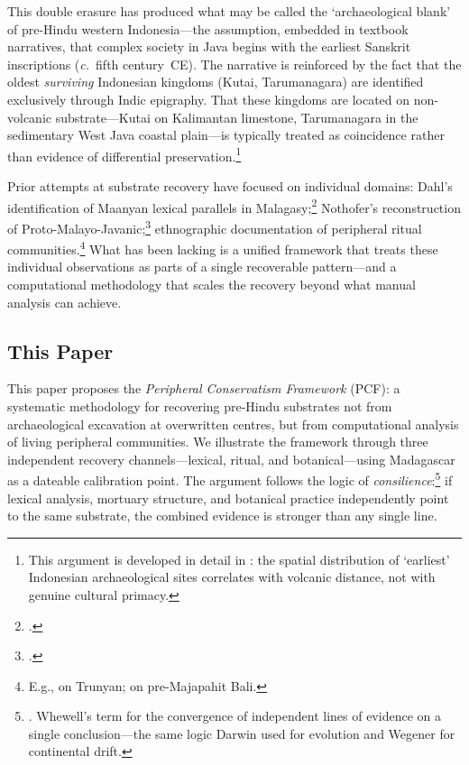 \documentclass[12pt,a4paper]{article}
\begin{document}
This double erasure has produced what may be called the `archaeological blank' of pre-Hindu western Indonesia---the assumption, embedded in textbook narratives, that complex society in Java begins with the earliest Sanskrit inscriptions (\textit{c.}~fifth century~CE). The narrative is reinforced by the fact that the oldest \emph{surviving} Indonesian kingdoms (Kutai, Tarumanagara) are identified exclusively through Indic epigraphy. That these kingdoms are located on non-volcanic substrate---Kutai on Kalimantan limestone, Tarumanagara in the sedimentary West Java coastal plain---is typically treated as coincidence rather than evidence of differential preservation.\footnote{This argument is developed in detail in \autocite{amien2026a}: the spatial distribution of `earliest' Indonesian archaeological sites correlates with volcanic distance, not with genuine cultural primacy.}

Prior attempts at substrate recovery have focused on individual domains: Dahl's identification of Maanyan lexical parallels in Malagasy;\footnote{\autocite{dahl1951malgache}.} Nothofer's reconstruction of Proto-Malayo-Javanic;\footnote{\autocite{nothofer1975reconstruction}.} ethnographic documentation of peripheral ritual communities.\footnote{E.g., \autocite{danandjaja1980kebudayaan} on Trunyan; \autocite{covarrubias1937bali} on pre-Majapahit Bali.} What has been lacking is a unified framework that treats these individual observations as parts of a single recoverable pattern---and a computational methodology that scales the recovery beyond what manual analysis can achieve.

\subsection{This Paper}

This paper proposes the \emph{Peripheral Conservatism Framework} (PCF): a systematic methodology for recovering pre-Hindu substrates not from archaeological excavation at overwritten centres, but from computational analysis of living peripheral communities. We illustrate the framework through three independent recovery channels---lexical, ritual, and botanical---using Madagascar as a dateable calibration point. The argument follows the logic of \emph{consilience}:\footnote{\autocite{whewell1840philosophy}. Whewell's term for the convergence of independent lines of evidence on a single conclusion---the same logic Darwin used for evolution and Wegener for continental drift.} if lexical analysis, mortuary structure, and botanical practice independently point to the same substrate, the combined evidence is stronger than any single line.
\end{document}
